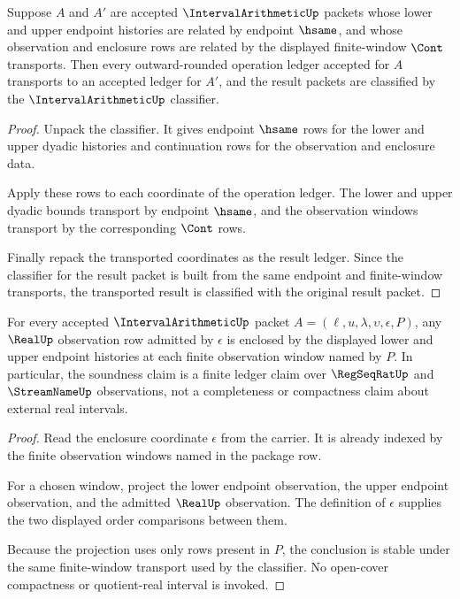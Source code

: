 \begin{theorem}
\label{thm:intervalarithmetic-classifier-transport}
Suppose $A$ and $A'$ are accepted $\IntervalArithmeticUp$ packets whose lower and upper endpoint histories are related by endpoint $\hsame$, and whose observation and enclosure rows are related by the displayed finite-window $\Cont$ transports. Then every outward-rounded operation ledger accepted for $A$ transports to an accepted ledger for $A'$, and the result packets are classified by the $\IntervalArithmeticUp$ classifier.
\end{theorem}
\begin{proof}
Unpack the classifier. It gives endpoint $\hsame$ rows for the lower and upper dyadic histories and continuation rows for the observation and enclosure data.

Apply these rows to each coordinate of the operation ledger. The lower and upper dyadic bounds transport by endpoint $\hsame$, and the observation windows transport by the corresponding $\Cont$ rows.

Finally repack the transported coordinates as the result ledger. Since the classifier for the result packet is built from the same endpoint and finite-window transports, the transported result is classified with the original result packet.
\end{proof}

\begin{theorem}
\label{thm:intervalarithmetic-realup-enclosure-soundness}
For every accepted $\IntervalArithmeticUp$ packet $A=(\ell,u,\lambda,\upsilon,\epsilon,P)$, any $\RealUp$ observation row admitted by $\epsilon$ is enclosed by the displayed lower and upper endpoint histories at each finite observation window named by $P$. In particular, the soundness claim is a finite ledger claim over $\RegSeqRatUp$ and $\StreamNameUp$ observations, not a completeness or compactness claim about external real intervals.
\end{theorem}
\begin{proof}
Read the enclosure coordinate $\epsilon$ from the carrier. It is already indexed by the finite observation windows named in the package row.

For a chosen window, project the lower endpoint observation, the upper endpoint observation, and the admitted $\RealUp$ observation. The definition of $\epsilon$ supplies the two displayed order comparisons between them.

Because the projection uses only rows present in $P$, the conclusion is stable under the same finite-window transport used by the classifier. No open-cover compactness or quotient-real interval is invoked.
\end{proof}

